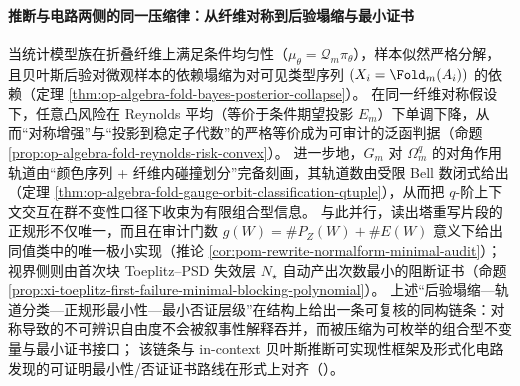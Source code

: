 \paragraph{推断与电路两侧的同一压缩律：从纤维对称到后验塌缩与最小证书}
当统计模型族在折叠纤维上满足条件均匀性（\(\mu_\theta=\mathcal Q_m\pi_\theta\)），样本似然严格分解，且贝叶斯后验对微观样本的依赖塌缩为对可见类型序列 \((X_i=\Fold_m(A_i))\) 的依赖（定理 \ref{thm:op-algebra-fold-bayes-posterior-collapse}）。
在同一纤维对称假设下，任意凸风险在 Reynolds 平均（等价于条件期望投影 \(E_m\)）下单调下降，从而“对称增强”与“投影到稳定子代数”的严格等价成为可审计的泛函判据（命题 \ref{prop:op-algebra-fold-reynolds-risk-convex}）。
进一步地，\(G_m\) 对 \(\Omega_m^q\) 的对角作用轨道由“颜色序列 + 纤维内碰撞划分”完备刻画，其轨道数由受限 Bell 数闭式给出（定理 \ref{thm:op-algebra-fold-gauge-orbit-classification-qtuple}），从而把 \(q\)-阶上下文交互在群不变性口径下收束为有限组合型信息。
与此并行，读出塔重写片段的正规形不仅唯一，而且在审计门数 \(g(W)=\#P_Z(W)+\#E(W)\) 意义下给出同值类中的唯一极小实现（推论 \ref{cor:pom-rewrite-normalform-minimal-audit}）；
视界侧则由首次块 Toeplitz--PSD 失效层 \(N_\star\) 自动产出次数最小的阻断证书（命题 \ref{prop:xi-toeplitz-first-failure-minimal-blocking-polynomial}）。
上述“后验塌缩—轨道分类—正规形最小性—最小否证层级”在结构上给出一条可复核的同构链条：对称导致的不可辨识自由度不会被叙事性解释吞并，而被压缩为可枚举的组合型不变量与最小证书接口；
该链条与 in-context 贝叶斯推断可实现性框架及形式化电路发现的可证明最小性/否证证书路线在形式上对齐（\cite{ReuterRudnerFortuinRugamer2025FullBayesICL,ZhangEtAl2026ActionableMISurvey,HadadKatzBassan2026FormalMIProvableCircuit}）。

